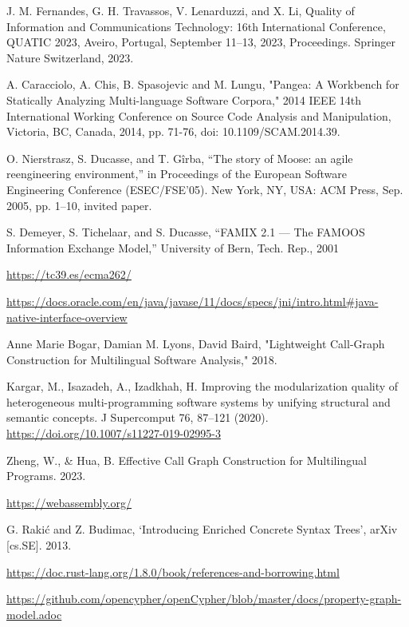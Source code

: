 \begin{thebibliography}{00}
    J. M. Fernandes, G. H. Travassos, V. Lenarduzzi, and X. Li, 
    Quality of Information and Communications Technology: 
    16th International Conference, QUATIC 2023,
    Aveiro, Portugal, September 11--13, 2023,
    Proceedings. Springer Nature Switzerland, 2023.

    A. Caracciolo, A. Chis, B. Spasojevic and
    M. Lungu, "Pangea: A Workbench for Statically Analyzing Multi-language Software Corpora,"
    2014 IEEE 14th International Working Conference on Source Code Analysis
    and Manipulation, Victoria, BC, Canada, 2014,
    pp. 71-76, doi: 10.1109/SCAM.2014.39.

    O. Nierstrasz, S. Ducasse, and T. Gîrba, “The story of Moose: an
    agile reengineering environment,” in Proceedings of the European
    Software Engineering Conference (ESEC/FSE’05). New York, NY,
    USA: ACM Press, Sep. 2005, pp. 1–10, invited paper.

    S. Demeyer, S. Tichelaar, and S. Ducasse, “FAMIX 2.1 — The FAMOOS
    Information Exchange Model,” University of Bern, Tech. Rep., 2001

    \url{https://tc39.es/ecma262/}

    \url{https://docs.oracle.com/en/java/javase/11/docs/specs/jni/intro.html#java-native-interface-overview}

    Anne Marie Bogar, Damian M. Lyons, David Baird,
    "Lightweight Call-Graph Construction for Multilingual Software Analysis," 2018.

    Kargar, M., Isazadeh, A., Izadkhah, H.
    Improving the modularization quality of heterogeneous multi-programming software systems by unifying structural and semantic concepts.
    J Supercomput 76, 87–121 (2020). \url{https://doi.org/10.1007/s11227-019-02995-3}

    Zheng, W., \& Hua, B. Effective Call Graph Construction for Multilingual Programs. 2023.

    \url{https://webassembly.org/}

    G. Rakić and Z. Budimac, ‘Introducing Enriched Concrete Syntax Trees’, arXiv [cs.SE]. 2013.

    \url{https://doc.rust-lang.org/1.8.0/book/references-and-borrowing.html}

    \url{https://github.com/opencypher/openCypher/blob/master/docs/property-graph-model.adoc}


\end{thebibliography}
